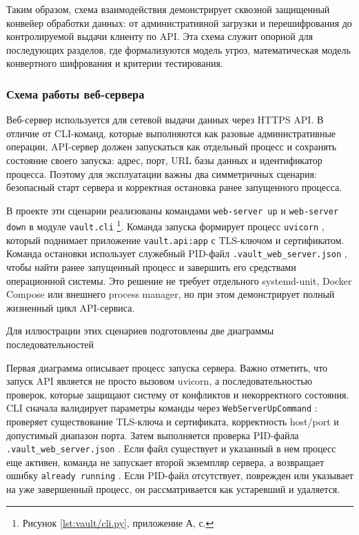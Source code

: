 \documentclass[14pt, a4paper]{extarticle}
\newcommand{\listingsappendix}{А}
\newcommand{\listingfootnote}[1]{\footnote{Рисунок \ref{#1}, приложение \listingsappendix{}, с. \pageref{#1}}}
\renewcommand{\texttt}[1]{%
  {\def\UrlFont{\ttfamily}\nolinkurl{#1}}%
}
\begin{document}
	Таким образом, схема взаимодействия демонстрирует сквозной защищенный конвейер обработки данных: от административной загрузки и перешифрования до контролируемой выдачи клиенту по API. Эта схема служит опорной для последующих разделов, где формализуются модель угроз, математическая модель конвертного шифрования и критерии тестирования.
	
	\subsubsection{Схема работы веб-сервера}
	
	Веб-сервер используется для сетевой выдачи данных через HTTPS API. В отличие от CLI-команд, которые выполняются как разовые административные операции, API-сервер должен запускаться как отдельный процесс и сохранять состояние своего запуска: адрес, порт, URL базы данных и идентификатор процесса. Поэтому для эксплуатации важны два симметричных сценария: безопасный старт сервера и корректная остановка ранее запущенного процесса.
	
	В проекте эти сценарии реализованы командами \texttt{web-server up} и \texttt{web-server down} в модуле \texttt{vault.cli}\listingfootnote{lst:vault/cli.py}. Команда запуска формирует процесс \texttt{uvicorn}, который поднимает приложение \texttt{vault.api:app} с TLS-ключом и сертификатом. Команда остановки использует служебный PID-файл \texttt{.vault\_web\_server.json}, чтобы найти ранее запущенный процесс и завершить его средствами операционной системы. Это решение не требует отдельного systemd-unit, Docker Compose или внешнего process manager, но при этом демонстрирует полный жизненный цикл API-сервиса.
	
	Для иллюстрации этих сценариев подготовлены две диаграммы последовательностей
	
	Первая диаграмма описывает процесс запуска сервера. Важно отметить, что запуск API является не просто вызовом uvicorn, а последовательностью проверок, которые защищают систему от конфликтов и некорректного состояния. CLI сначала валидирует параметры команды через \texttt{WebServerUpCommand}: проверяет существование TLS-ключа и сертификата, корректность host/port и допустимый диапазон порта. Затем выполняется проверка PID-файла \texttt{.vault\_web\_server.json}. Если файл существует и указанный в нем процесс еще активен, команда не запускает второй экземпляр сервера, а возвращает ошибку \texttt{already running}. Если PID-файл отсутствует, поврежден или указывает на уже завершенный процесс, он рассматривается как устаревший и удаляется.
	
\end{document}
